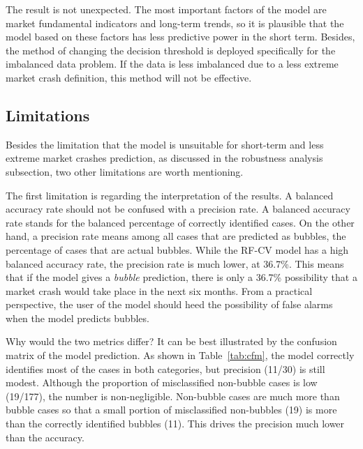 \documentclass[12pt, man, a4paper, floatsintext]{apa7}
\begin{document}
The result is not unexpected. The most important factors of the model are market fundamental indicators and long-term trends, so it is plausible that the model based on these factors has less predictive power in the short term. Besides, the method of changing the decision threshold is deployed specifically for the imbalanced data problem. If the data is less imbalanced due to a less extreme market crash definition, this method will not be effective.

\subsection{Limitations}

Besides the limitation that the model is unsuitable for short-term and less extreme market crashes prediction, as discussed in the robustness analysis subsection, two other limitations are worth mentioning.

The first limitation is regarding the interpretation of the results. A balanced accuracy rate should not be confused with a precision rate. A balanced accuracy rate stands for the balanced percentage of correctly identified cases. On the other hand, a precision rate means among all cases that are predicted as bubbles, the percentage of cases that are actual bubbles. While the RF-CV model has a high balanced accuracy rate, the precision rate is much lower, at 36.7\%. This means that if the model gives a \emph{bubble} prediction, there is only a 36.7\% possibility that a market crash would take place in the next six months. From a practical perspective, the user of the model should heed the possibility of false alarms when the model predicts bubbles.

Why would the two metrics differ? It can be best illustrated by the confusion matrix of the model prediction. As shown in Table~\ref{tab:cfm}, the model correctly identifies most of the cases in both categories, but precision (11/30) is still modest. Although the proportion of misclassified non-bubble cases is low (19/177), the number is non-negligible. Non-bubble cases are much more than bubble cases so that a small portion of misclassified non-bubbles (19) is more than the correctly identified bubbles (11). This drives the precision much lower than the accuracy. 


\end{document}
